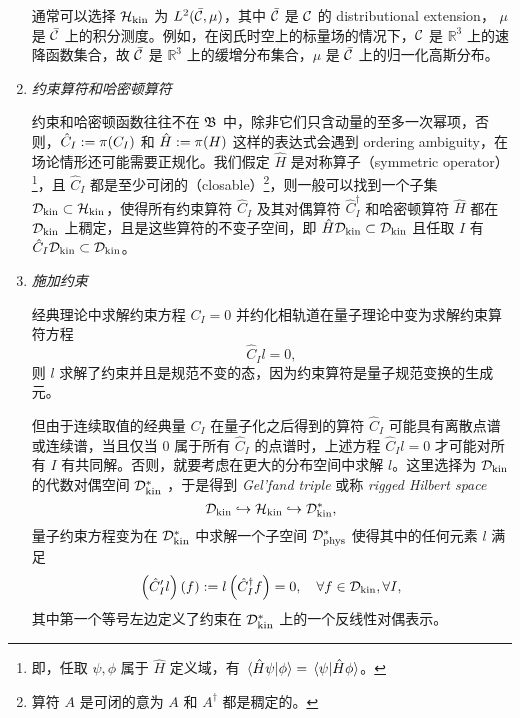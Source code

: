 \begin{enumerate}
					通常可以选择 $\mathcal{H}_{\text{kin}}$ 为 $L^2(\bar{\mathcal{C}},\mu)$，其中 $\bar{\mathcal{C}}$ 是 $\mathcal{C}$ 的 distributional extension， $\mu$ 是 $\bar{\mathcal{C}}$ 上的积分测度。例如，在闵氏时空上的标量场的情况下，$\mathcal{C}$ 是 $\mathbb{R}^{3}$ 上的速降函数集合，故 $\bar{\mathcal{C}}$ 是 $\mathbb{R}^{3}$ 上的缓增分布集合，$\mu$ 是 $\bar{\mathcal{C}}$ 上的归一化高斯分布。

			\item \emph{约束算符和哈密顿算符}
			
					约束和哈密顿函数往往不在 $\mathfrak{B}$ 中，除非它们只含动量的至多一次幂项，否则，$\hat{C}_I := \pi(C_I)$ 和 $\hat{H} := \pi(H)$ 这样的表达式会遇到 ordering ambiguity，在场论情形还可能需要正规化。我们假定 $\hat{H}$ 是对称算子（symmetric operator）\footnote{即，任取 $\psi,\phi$ 属于 $\hat{H}$ 定义域，有 $\ip*{\hat{H}\psi}{\phi} = \ip*{\psi}{\hat{H} \phi}$。}，且 $\hat{C}_I$ 都是至少可闭的（closable）\footnote{算符 $A$ 是可闭的意为 $A$ 和 $A^\dagger$ 都是稠定的。}，则一般可以找到一个子集 $\mathcal{D}_{\text{kin}} \subset \mathcal{H}_{\text{kin}}$，使得所有约束算符 $\hat{C}_I$ 及其对偶算符 $\hat{C}_I^\dagger$ 和哈密顿算符 $\hat{H}$ 都在 $\mathcal{D}_{\text{kin}}$ 上稠定，且是这些算符的不变子空间，即 $\hat{H} \mathcal{D}_{\text{kin}} \subset \mathcal{D}_{\text{kin}}$ 且任取 $I$ 有 $\hat{C}_I \mathcal{D}_{\text{kin}} \subset \mathcal{D}_{\text{kin}}$。

			\item \emph{施加约束}
			
					经典理论中求解约束方程 $C_I=0$ 并约化相轨道在量子理论中变为求解约束算符方程 
					\begin{equation}
						\hat{C}_I l =0,
					\end{equation}
					则 $l$ 求解了约束并且是规范不变的态，因为约束算符是量子规范变换的生成元。

					但由于连续取值的经典量 $C_I$ 在量子化之后得到的算符 $\hat{C}_I$ 可能具有离散点谱或连续谱，当且仅当 $0$ 属于所有 $\hat{C}_I$ 的点谱时，上述方程 $\hat{C}_I l =0$ 才可能对所有 $I$ 有共同解。否则，就要考虑在更大的分布空间中求解 $l$。这里选择为 $\mathcal{D}_{\text{kin}}$ 的代数对偶空间 $\mathcal{D}_{\text{kin}}^*$ ，于是得到 \emph{Gel'fand triple} 或称 \emph{rigged Hilbert space}
					\begin{equation}
						\mathcal{D}_{\text{kin}} \hookrightarrow \mathcal{H}_{\text{kin}} \hookrightarrow \mathcal{D}_{\text{kin}}^*,
					\end{equation}
					量子约束方程变为在 $\mathcal{D}_{\text{kin}}^*$ 中求解一个子空间 $\mathcal{D}_{\text{phys}}^*$ 使得其中的任何元素 $l$ 满足
					\begin{equation}
						\left( \hat{C}_I^\prime l \right)(f) \definedby l \left( \hat{C}_I^\dagger f \right) = 0 \qc \forall f \in \Dkin, \forall I,
					\end{equation}
					其中第一个等号左边定义了约束在 $\mathcal{D}_{\text{kin}}^*$ 上的一个反线性对偶表示。


\end{enumerate}
